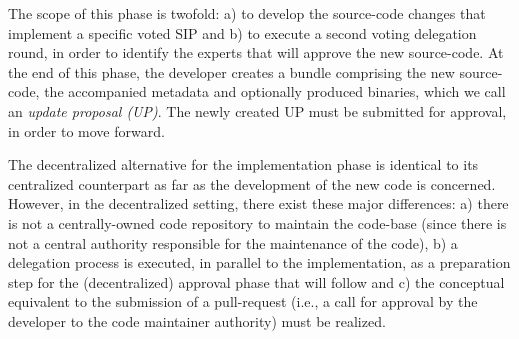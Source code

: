 The scope of this phase is twofold: a) to develop the source-code changes that implement a specific voted SIP and b) to execute a second voting delegation round, in order to identify the experts that will approve the new source-code. At the end of this phase, the developer creates a bundle comprising the new source-code, the accompanied metadata and optionally produced binaries, which we call an \emph{update proposal (UP)}. The newly created UP must be submitted for approval, in order to move forward.


The decentralized alternative for the implementation phase is identical to its centralized counterpart as far as the development of the new code is concerned. However, in the decentralized setting, there exist these major differences:
a) there is not a centrally-owned code repository to maintain the code-base (since there is not a central authority responsible for the maintenance of the code), b) a delegation process is executed, in parallel to the implementation, as a preparation step for the (decentralized) approval phase that will follow and c) the conceptual equivalent to the submission of a pull-request (i.e., a call for approval by the developer to the code maintainer authority) must be realized.

